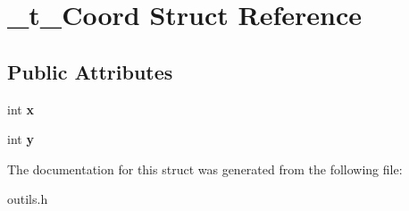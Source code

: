 \hypertarget{struct__t__Coord}{}\section{\+\_\+t\+\_\+\+Coord Struct Reference}
\label{struct__t__Coord}
\subsection*{Public Attributes}
\begin{DoxyCompactItemize}
\item 
int {\bfseries x}\hypertarget{struct__t__Coord_a593a81026d9ad7bec726736ce32c5660}{}\label{struct__t__Coord_a593a81026d9ad7bec726736ce32c5660}

\item 
int {\bfseries y}\hypertarget{struct__t__Coord_ae4e218fd7b05406f283e6dbbccffff35}{}\label{struct__t__Coord_ae4e218fd7b05406f283e6dbbccffff35}

\end{DoxyCompactItemize}


The documentation for this struct was generated from the following file\+:\begin{DoxyCompactItemize}
\item 
outils.\+h\end{DoxyCompactItemize}
